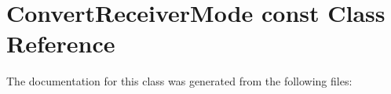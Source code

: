 \hypertarget{classConvertReceiverMode_01const}{}\section{Convert\+Receiver\+Mode const Class Reference}
\label{classConvertReceiverMode_01const}


The documentation for this class was generated from the following files\+: